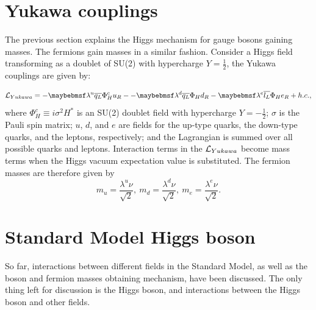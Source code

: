 \section{Yukawa couplings}

The previous section explains the Higgs mechanism for gauge bosons gaining masses. The fermions gain masses in a similar fashion. Consider a Higgs field transforming as a doublet of SU(2) with hypercharge $Y = \frac{1}{2}$, the Yukawa couplings are given by:

\begin{equation}
\Lagr_{Yukawa} = -\lambda^{u}\overline{q_L}\Phi_H^{c}u_R - -\lambda^{d}\overline{q_L}\Phi_H{d}_R - \lambda^{e}\overline{l_L}\Phi_{H}e_R + h.c. ,
\end{equation}
where $\Phi_H^{c} \equiv i \sigma^2H^*$ is an SU(2) doublet field with hypercharge $Y = -\frac{1}{2}$; $\sigma$ is the Pauli spin matrix; $u$, $d$, and $e$ are fields for the up-type quarks, the down-type quarks, and the leptons, respectively; and the Lagrangian is summed over all possible quarks and leptons. Interaction terms in the $\operatorname{\mathcal{L}}_{Yukawa}$ become mass terms when the Higgs vacuum expectation value is substituted. The fermion masses are therefore given by
\begin{equation}
m_{u} = \frac{\lambda^u{\nu}}{\sqrt{2}},\ m_{d} = \frac{\lambda^d{\nu}}{\sqrt{2}},\ m_{e} = \frac{\lambda^e{\nu}}{\sqrt{2}}.
\end{equation}

\section{Standard Model Higgs boson}
\label{sec:theoryHiggsBoson}

So far, interactions between different fields in the Standard Model, as well as the boson and fermion masses obtaining mechanism, have been discussed. The only thing left for discussion is the Higgs boson, and  interactions between the Higgs boson and other fields.

